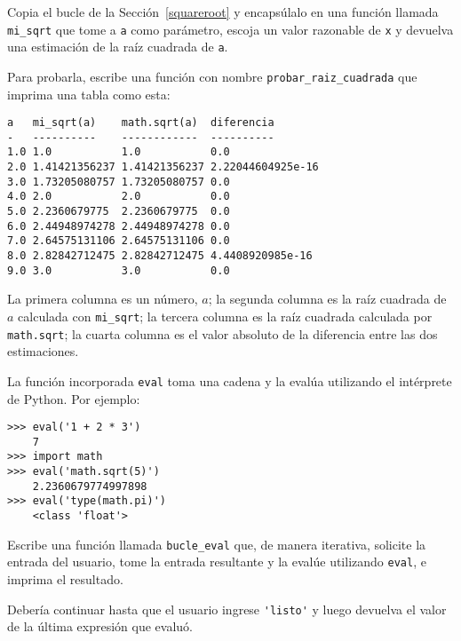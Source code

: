 \documentclass[10pt]{book}
\begin{document}
\begin{exercise}

Copia el bucle de la Sección~\ref{squareroot}
y encapsúlalo en una función llamada
\verb"mi_sqrt" que tome a {\tt a} como parámetro, escoja un
valor razonable de {\tt x} y devuelva una estimación de la raíz
cuadrada de {\tt a}.  

Para probarla, escribe una función con nombre \verb"probar_raiz_cuadrada"
que imprima una tabla como esta:

\begin{verbatim}
a   mi_sqrt(a)    math.sqrt(a)  diferencia
-   ----------    ------------  ----------
1.0 1.0           1.0           0.0
2.0 1.41421356237 1.41421356237 2.22044604925e-16
3.0 1.73205080757 1.73205080757 0.0
4.0 2.0           2.0           0.0
5.0 2.2360679775  2.2360679775  0.0
6.0 2.44948974278 2.44948974278 0.0
7.0 2.64575131106 2.64575131106 0.0
8.0 2.82842712475 2.82842712475 4.4408920985e-16
9.0 3.0           3.0           0.0
\end{verbatim}
%
La primera columna es un número, $a$; la segunda columna es la raíz
cuadrada de $a$ calculada con \verb"mi_sqrt"; la tercera columna es la
raíz cuadrada calculada por {\tt math.sqrt}; la cuarta columna es el
valor absoluto de la diferencia entre las dos estimaciones.
\end{exercise}


\begin{exercise}

La función incorporada {\tt eval} toma una cadena y la evalúa
utilizando el intérprete de Python.  Por ejemplo:

\begin{verbatim}
>>> eval('1 + 2 * 3')
    7
>>> import math
>>> eval('math.sqrt(5)')
    2.2360679774997898
>>> eval('type(math.pi)')
    <class 'float'>
\end{verbatim}
%
Escribe una función llamada \verb"bucle_eval" que, de manera iterativa,
solicite la entrada del usuario, tome la entrada resultante y la evalúe
utilizando {\tt eval}, e imprima el resultado.

Debería continuar hasta que el usuario ingrese \verb"'listo'" y luego
devuelva el valor de la última expresión que evaluó.

\end{exercise}
\end{document}
